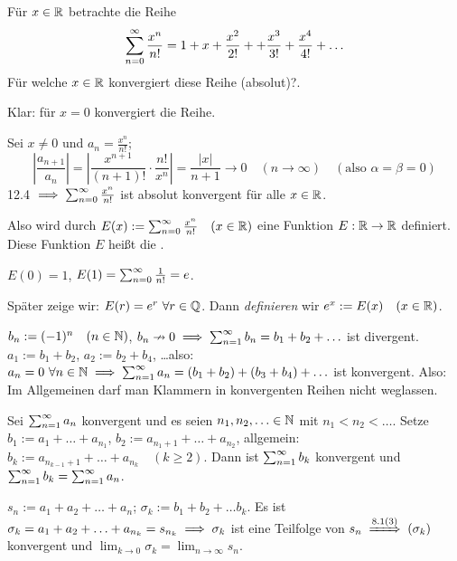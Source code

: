 \documentclass[a4paper,twoside,DIV15,BCOR12mm]{scrbook}
\begin{document}
\begin{wichtigesbeispiel}[Exponentialfunktion]
Für $x\in\mathbb{R}$ betrachte die Reihe
$$\sum_{n=0}^{\infty}{\frac{x^n}{n!}} = 1 + x + \frac{x^2}{2!} + +\frac{x^3}{3!} + \frac{x^4}{4!} + \ldots$$
Für welche $x\in\mathbb{R}$ konvergiert diese Reihe (absolut)?.

Klar: für $x=0$ konvergiert die Reihe.

Sei $x\ne0$ und $a_n=\frac{x^n}{n!}$;
$$\left|\frac{a_{n+1}}{a_n}\right| = \left| \frac{x^{n+1}}{(n+1)!} \cdot \frac{n!}{x^n}\right| = \frac{|x|}{n+1} \to 0 \quad (n\to\infty) \quad (\text{also } \alpha = \beta = 0)$$
12.4 $\implies \sum_{n=0}^{\infty}{\frac{x^n}{n!}}$ ist absolut konvergent für alle $x\in\mathbb{R}$.

Also wird durch $E(x) := \sum_{n=0}^{\infty}{\frac{x^n}{n!}} \quad (x\in\mathbb{R})$ eine Funktion $E: \mathbb{R} \to \mathbb{R}$ definiert. Diese Funktion $E$ heißt die .

$E(0) = 1$, $E(1)=\sum_{n=0}^{\infty}{\frac{1}{n!}} = e$.

\begin{bemerkung}
Später zeige wir: $E(r) = e^r \ \forall r\in\mathbb{Q}$. Dann \textit{definieren} wir $e^x := E(x) \quad (x\in\mathbb{R})$.
\end{bemerkung}
\end{wichtigesbeispiel}

\begin{motivation}
$b_n := (-1)^n \quad (n\in\mathbb{N})$, $b_n \nrightarrow 0 \implies \sum_{n=1}^{\infty}{b_n}=b_1 + b_2 + \ldots$ ist divergent. \\
$a_1 := b_1 + b_2$, $a_2 := b_2 + b_4$, \ldots also: $a_n = 0 \ \forall n\in\mathbb{N} \implies \sum_{n=1}^{\infty}{a_n} = (b_1+b_2) + (b_3+b_4) + \ldots$ ist konvergent. Also: \glqq Im Allgemeinen darf man Klammern in konvergenten Reihen nicht weglassen.\grqq
\end{motivation}

\begin{satz}

Sei $\sum_{n=1}^{\infty}{a_n}$ konvergent und es seien $n_1, n_2, \ldots \in\mathbb{N}$ mit $n_1<n_2<\ldots$. Setze $b_1 := a_1 + \ldots + a_{n_1}$, $b_2 := a_{n_1+1} + \ldots + a_{n_2}$, allgemein: $b_k := a_{n_{k-1}+1} + \ldots + a_{n_k} \quad (k\ge2)$. Dann ist $\sum_{n=1}^{\infty}{b_k}$ konvergent und $\sum_{n=1}^{\infty}{b_k} = \sum_{n=1}^{\infty}{a_n}$.
\end{satz}

\begin{beweis}
$s_n := a_1 + a_2 + \ldots + a_n$; $\sigma_k := b_1 + b_2 + \ldots b_k$. Es ist $\sigma_k = a_1 + a_2 + \ldots + a_{n_k} = s_{n_k} \implies \sigma_k$ ist eine Teilfolge von $s_n \folgtnach{8.1(3)} (\sigma_k)$ konvergent und $\lim_{k\to0}\sigma_k=\lim_{n\to\infty}s_n$.
\end{beweis}
\end{document}
